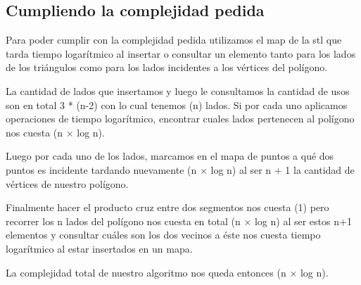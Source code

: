 \subsection{Cumpliendo la complejidad pedida}
Para poder cumplir con la complejidad pedida utilizamos el map de la stl que tarda tiempo logarítmico al insertar o consultar un elemento tanto para los lados de los triángulos como para los lados incidentes a los vértices del polígono.\newline

La cantidad de lados que insertamos y luego le consultamos la cantidad de usos son en total 3 * (n-2) con lo cual tenemos \bigo(n) lados. Si por cada uno aplicamos operaciones de tiempo logarítmico, encontrar cuales lados pertenecen al polígono nos cuesta \bigo(n $\times$ log n).\newline

Luego por cada uno de los lados, marcamos en el mapa de puntos a qué dos puntos es incidente tardando nuevamente \bigo(n $\times$ log n) al ser n + 1 la cantidad de vértices de nuestro polígono.\newline

Finalmente hacer el producto cruz entre dos segmentos nos cuesta \bigo(1) pero recorrer los n lados del polígono nos cuesta en total \bigo(n $\times$ log n) al ser estos n+1 elementos y consultar cuáles son los dos vecinos a éste nos cuesta tiempo logarítmico al estar insertados en un mapa.\newline

La complejidad total de nuestro algoritmo nos queda entonces \bigo(n $\times$ log n).\newline